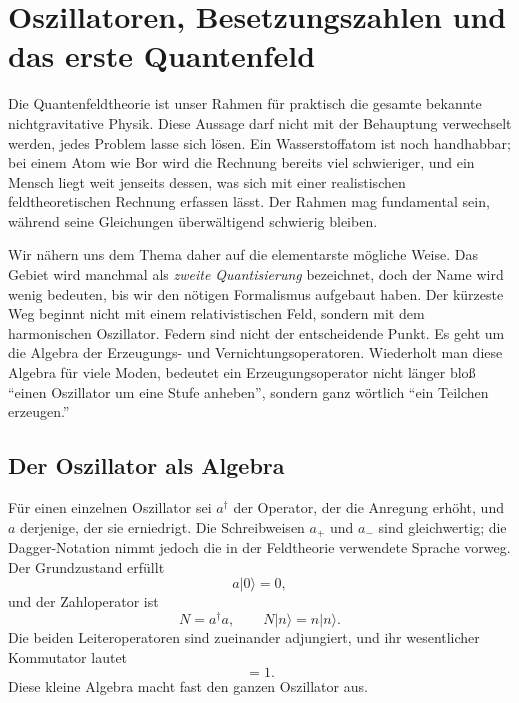 \chapter{Oszillatoren, Besetzungszahlen und das erste Quantenfeld}

Die Quantenfeldtheorie ist unser Rahmen für praktisch die gesamte bekannte nichtgravitative Physik. Diese Aussage darf nicht mit der Behauptung verwechselt werden, jedes Problem lasse sich lösen. Ein Wasserstoffatom ist noch handhabbar; bei einem Atom wie Bor wird die Rechnung bereits viel schwieriger, und ein Mensch liegt weit jenseits dessen, was sich mit einer realistischen feldtheoretischen Rechnung erfassen lässt. Der Rahmen mag fundamental sein, während seine Gleichungen überwältigend schwierig bleiben.

Wir nähern uns dem Thema daher auf die elementarste mögliche Weise. Das Gebiet wird manchmal als \emph{zweite Quantisierung} bezeichnet, doch der Name wird wenig bedeuten, bis wir den nötigen Formalismus aufgebaut haben. Der kürzeste Weg beginnt nicht mit einem relativistischen Feld, sondern mit dem harmonischen Oszillator. Federn sind nicht der entscheidende Punkt. Es geht um die Algebra der Erzeugungs- und Vernichtungsoperatoren. Wiederholt man diese Algebra für viele Moden, bedeutet ein Erzeugungsoperator nicht länger bloß ``einen Oszillator um eine Stufe anheben'', sondern ganz wörtlich ``ein Teilchen erzeugen.''

\section{Der Oszillator als Algebra}

Für einen einzelnen Oszillator sei \(a^\dagger\) der Operator, der die Anregung erhöht, und \(a\) derjenige, der sie erniedrigt. Die Schreibweisen \(a_+\) und \(a_-\) sind gleichwertig; die Dagger-Notation nimmt jedoch die in der Feldtheorie verwendete Sprache vorweg. Der Grundzustand erfüllt
\begin{equation}
a|0\rangle=0,
\end{equation}
und der Zahloperator ist
\begin{equation}
N=a^\dagger a,
\qquad
N|n\rangle=n|n\rangle.
\end{equation}
Die beiden Leiteroperatoren sind zueinander adjungiert, und ihr wesentlicher Kommutator lautet
\begin{equation}
[a,a^\dagger]=1.
\label{eq:l06-single-commutator}
\end{equation}
Diese kleine Algebra macht fast den ganzen Oszillator aus.

